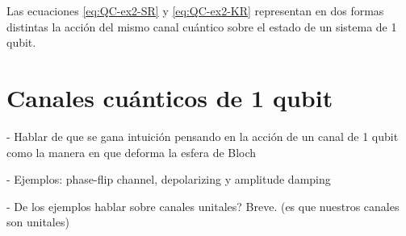 
Las ecuaciones \eqref{eq:QC-ex2-SR} y \eqref{eq:QC-ex2-KR} representan
en dos formas distintas la acción del mismo canal cuántico  
sobre el estado de un sistema de 1 qubit.

\section{Canales cuánticos de 1 qubit}
- Hablar de que se gana intuición pensando en la acción de un canal de 1
qubit como la manera en que deforma la esfera de Bloch

- Ejemplos: phase-flip channel, depolarizing y amplitude damping 

- De los ejemplos hablar sobre canales unitales? Breve. (es que nuestros
canales son unitales)


